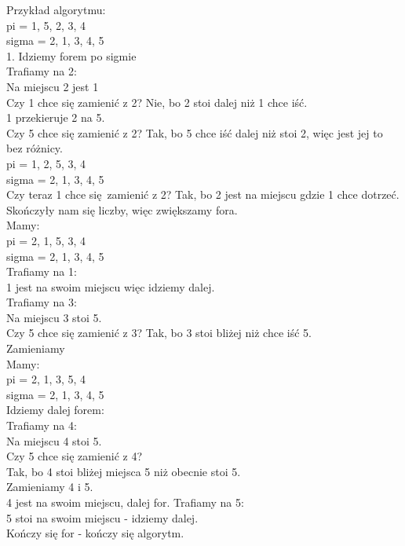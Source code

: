 \documentclass[12pt]{article}
\begin{document}
Przykład algorytmu:\\
pi = {1, 5, 2, 3, 4}\\
sigma = {2, 1, 3, 4, 5}\\
1. Idziemy forem po sigmie\\
Trafiamy na 2:\\
Na miejscu 2 jest 1 \\
Czy 1 chce się zamienić z 2? Nie, bo 2 stoi dalej niż 1 chce iść. \\
1 przekieruje 2 na 5.\\
Czy 5 chce się zamienić z 2? Tak, bo 5 chce iść dalej niż stoi 2, więc jest jej to bez różnicy.\\
pi = {1, 2, 5, 3, 4}\\
sigma = {2, 1, 3, 4, 5}\\
Czy teraz 1 chce się zamienić z 2? Tak, bo 2 jest na miejscu gdzie 1 chce dotrzeć.\\
Skończyły nam się liczby, więc zwiększamy fora.\\
Mamy:\\
pi = {2, 1, 5, 3, 4}\\
sigma = {2, 1, 3, 4, 5}\\
Trafiamy na 1:\\
1 jest na swoim miejscu więc idziemy dalej.\\
Trafiamy na 3:\\
Na miejscu 3 stoi 5.\\
Czy 5 chce się zamienić z 3? Tak, bo 3 stoi bliżej niż chce iść 5.\\
Zamieniamy\\
Mamy:\\
pi = {2, 1, 3, 5, 4}\\
sigma = {2, 1, 3, 4, 5}\\
Idziemy dalej forem:\\
Trafiamy na 4:\\
Na miejscu 4 stoi 5.\\
Czy 5 chce się zamienić z 4?\\
Tak, bo 4 stoi bliżej miejsca 5 niż obecnie stoi 5.\\
Zamieniamy 4 i 5.\\
4 jest na swoim miejscu, dalej for.
Trafiamy na 5:\\
5 stoi na swoim miejscu - idziemy dalej.\\
Kończy się for - kończy się algorytm.\\
\end{document}
